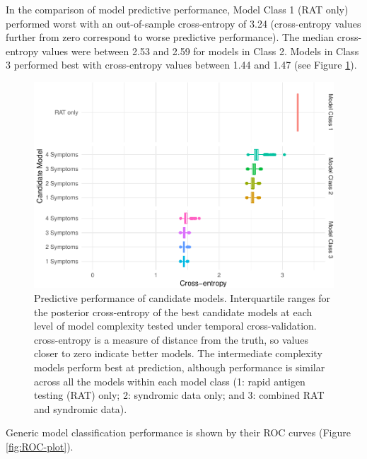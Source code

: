 \documentclass[]{elsarticle} %
\begin{document}
In the comparison of model predictive performance, Model Class 1 (RAT only) performed worst with an out-of-sample cross-entropy of 3.24 (cross-entropy values further from zero correspond to worse predictive performance).
The median cross-entropy values were between 2.53 and 2.59 for models in Class 2.
Models in Class 3 performed best with cross-entropy values between 1.44 and 1.47 (see Figure \ref{fig:pred-perf}).

\begin{figure}
\centering
\includegraphics{0501_MainText_files/figure-latex/pred-perf-1.pdf}
\caption{\label{fig:pred-perf}Predictive performance of candidate models. Interquartile ranges for the posterior cross-entropy of the best candidate models at each level of model complexity tested under temporal cross-validation. cross-entropy is a measure of distance from the truth, so values closer to zero indicate better models. The intermediate complexity models perform best at prediction, although performance is similar across all the models within each model class (1: rapid antigen testing (RAT) only; 2: syndromic data only; and 3: combined RAT and syndromic data).}
\end{figure}

Generic model classification performance is shown by their ROC curves (Figure \ref{fig:ROC-plot}).
\end{document}
